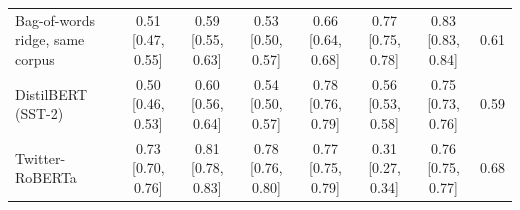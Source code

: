 \begin{tabular}{@{}lccccccc@{}}
Bag-of-words ridge, same corpus & 0.51 {\scriptsize[0.47, 0.55]} & 0.59 {\scriptsize[0.55, 0.63]} & 0.53 {\scriptsize[0.50, 0.57]} & 0.66 {\scriptsize[0.64, 0.68]} & 0.77 {\scriptsize[0.75, 0.78]} & 0.83 {\scriptsize[0.83, 0.84]} & 0.61 \\
DistilBERT (SST-2) & 0.50 {\scriptsize[0.46, 0.53]} & 0.60 {\scriptsize[0.56, 0.64]} & 0.54 {\scriptsize[0.50, 0.57]} & 0.78 {\scriptsize[0.76, 0.79]} & 0.56 {\scriptsize[0.53, 0.58]} & 0.75 {\scriptsize[0.73, 0.76]} & 0.59 \\
Twitter-RoBERTa & 0.73 {\scriptsize[0.70, 0.76]} & 0.81 {\scriptsize[0.78, 0.83]} & 0.78 {\scriptsize[0.76, 0.80]} & 0.77 {\scriptsize[0.75, 0.79]} & 0.31 {\scriptsize[0.27, 0.34]} & 0.76 {\scriptsize[0.75, 0.77]} & 0.68 \\
\bottomrule
\end{tabular}
